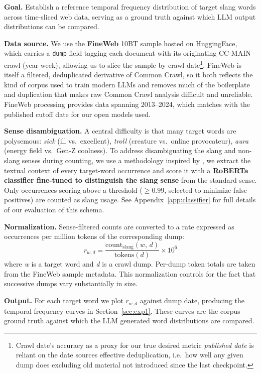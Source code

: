 \documentclass[11pt]{article}
\begin{document}
\textbf{Goal.} Establish a reference temporal frequency distribution of target slang words across time-sliced web data, serving as a ground truth against which LLM output distributions can be compared.

\textbf{Data source.} We use the \textbf{FineWeb} \citep{penedo2024the} 10BT sample hosted on HuggingFace, which carries a \texttt{dump} field tagging each document with its originating CC-MAIN crawl (year-week), allowing us to slice the sample by crawl date\footnote{Crawl date's accuracy as a proxy for our true desired metric \textit{published date} is reliant on the date sources effective deduplication, i.e.\ how well any given dump does excluding old material not introduced since the last checkpoint.}. FineWeb is itself a filtered, deduplicated derivative of Common Crawl, so it both reflects the kind of corpus used to train modern LLMs and removes much of the boilerplate and duplication that makes raw Common Crawl analysis difficult and unreliable. FineWeb processing provides data spanning 2013--2024, which matches with the published cutoff date for our open models used.

\textbf{Sense disambiguation.} A central difficulty is that many target words are polysemous: \textit{sick} (ill vs.\ excellent), \textit{troll} (creature vs.\ online provocateur), \textit{aura} (energy field vs.\ Gen-Z coolness). To address disambiguating the slang and non-slang senses during counting, we use a methodology inspired by \citep{aloraini2026slangdetection}, we extract the textual context of every target-word occurrence and score it with a \textbf{RoBERTa classifier fine-tuned to distinguish the slang sense} from the standard sense. Only occurrences scoring above a threshold ($\geq 0.99$, selected to minimize false positives) are counted as slang usage. See Appendix~\ref{app:classifier} for full details of our evaluation of this schema.

\textbf{Normalization.} Sense-filtered counts are converted to a rate expressed as occurrences per million tokens of the corresponding dump:
\[
r_{w,d} = \frac{\text{count}_{\text{slang}}(w,\, d)}{\text{tokens}(d)} \times 10^{6}
\]
where \textit{w} is a target word and \textit{d} is a crawl dump. Per-dump token totals are taken from the FineWeb sample metadata. This normalization controls for the fact that successive dumps vary substantially in size.

\textbf{Output.} For each target word we plot $r_{w,d}$ against dump date, producing the temporal frequency curves in Section~\ref{sec:exp1}. These curves are the corpus ground truth against which the LLM generated word distributions are compared.
\end{document}
